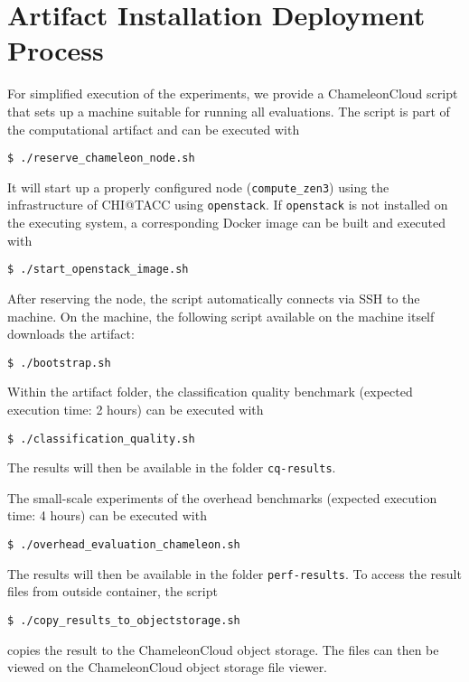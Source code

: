 \documentclass[twoside]{article}
\begin{document}
\section*{Artifact Installation Deployment Process}
For simplified execution of the experiments, we provide a ChameleonCloud script that sets up a machine suitable for running all evaluations.
The script is part of the computational artifact and can be executed with
{
\small
\begin{verbatim}
$ ./reserve_chameleon_node.sh
\end{verbatim}
}
It will start up a properly configured node (\texttt{compute\_zen3}) using the infrastructure of CHI@TACC using \texttt{openstack}.
If \texttt{openstack} is not installed on the executing system, a corresponding Docker image can be built and executed with
{
\small
\begin{verbatim}
$ ./start_openstack_image.sh
\end{verbatim}
}
After reserving the node, the script automatically connects via SSH to the machine.
On the machine, the following script available on the machine itself downloads the artifact:
{
\small
\begin{verbatim}
$ ./bootstrap.sh
\end{verbatim}
}

Within the artifact folder, the classification quality benchmark (expected execution time: 2 hours) can be executed with
{
\small
\begin{verbatim}
$ ./classification_quality.sh
\end{verbatim}
}

The results will then be available in the folder \texttt{cq-results}.

The small-scale experiments of the overhead benchmarks (expected execution time: 4 hours) can be executed with
{
\small
\begin{verbatim}
$ ./overhead_evaluation_chameleon.sh
\end{verbatim}
}

The results will then be available in the folder \texttt{perf-results}.
To access the result files from outside container, the script 

{
\small
\begin{verbatim}
$ ./copy_results_to_objectstorage.sh
\end{verbatim}
}

copies the result to the ChameleonCloud object storage.
The files can then be viewed on the ChameleonCloud object storage file viewer.
\end{document}

